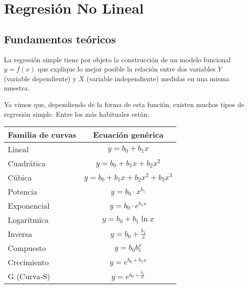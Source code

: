 
\chapter{Regresión No Lineal}

\section{Fundamentos teóricos}
La regresión simple tiene por objeto la construcción de un modelo
funcional $y=f(x)$ que explique lo mejor posible la relación entre
dos variables $Y$ (variable dependiente) y $X$ (variable
independiente) medidas en una misma muestra.

Ya vimos que, dependiendo de la forma de esta función, existen muchos tipos de regresión simple. Entre los más habituales están:
\begin{center}
\begin{tabular}{|l|c|}
\hline
 Familia de curvas       &     Ecuación genérica      \\
\hline\hline
 Lineal                  &          $y=b_0+b_1x$          \\
\hline
 Cuadrática              &       $y=b_0+b_1x+b_2x^2$        \\
\hline
 Cúbica & $y=b_0+b_1x+b_2x^2+b_3x^3$ \\
\hline
 Potencia               &       $y=b_0\cdot x^{b_1}$       \\
\hline
 Exponencial             &     $y=b_0\cdot e^{b_1x}$      \\
\hline
 Logarítmica             &       $y=b_0+b_1\ln x$        \\
\hline
Inversa             &       $y=b_0+\frac{b_1}{x}$        \\
\hline
Compuesto              &       $y=b_0b_1^x$        \\
\hline
Crecimiento             &       $y= e^{b_0 + b_1x}$        \\
\hline
G (Curva-S)             &       $y= e^{b_0 +\frac{b_1}{x} }$        \\
\hline
\end{tabular}
\end{center}

